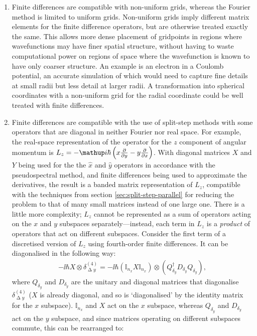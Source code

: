 \begin{enumerate}
    \item Finite differences are compatible with non-uniform grids, whereas the Fourier method is limited to uniform grids. Non-uniform grids imply different matrix elements \cite{fornberg_generation_1988} for the finite difference operators, but are otherwise treated exactly the same. This allows more dense placement of gridpoints in regions where wavefunctions may have finer spatial structure, without having to waste computational power on regions of space where the wavefunction is known to have only coarser structure. An example is an electron in a Coulomb potential, an accurate simulation of which would need to capture fine details at small radii but less detail at larger radii. A transformation into spherical coordinates with a non-uniform grid for the radial coordinate could be well treated with finite differences.
    \item Finite differences are compatible with the use of split-step methods with some operators that are diagonal in neither Fourier nor real space. For example, the real-space representation of the operator for the $z$ component of angular momentum is $L_z = -\ii\hbar\left(x\pdv{y} - y \pdv{x}\right)$. With diagonal matrices $X$ and $Y$ being used for the the $\hat x$ and $\hat y$ operators in accordance with the pseudospectral method, and finite differences being used to approximate the derivatives, the result is a banded matrix representation of $L_z$, compatible with the techniques from section \ref{sec:split-step-parallel} for reducing the problem to that of many small matrices instead of one large one. There is a little more complexity; $L_z$ cannot be represented as a sum of operators acting on the $x$ and $y$ subspaces separately---instead, each term in $L_z$ is a \emph{product} of operators that act on different subspaces. Consider the first term of a discretised version of $L_z$ using fourth-order finite differences. It can be diagonalised in the following way:
    \begin{align}
        -\ii\hbar X \otimes \delta^{(4)}_{\upDelta y}
        = -\ii\hbar\left(\mathbb{I}_{n_x} X \mathbb{I}_{n_x}\right)
        \otimes \left(Q_{\delta_y}^\dagger D_{\delta_y}Q_{\delta_y}\right),
    \end{align}
    where $Q_{\delta_y}$ and $D_{\delta_y}$ are the unitary and diagonal matrices that diagonalise $\delta^{(4)}_{\upDelta y}$ ($X$ is already diagonal, and so is `diagonalised' by the identity matrix for the $x$ subspace). $\mathbb{I}_{n_x}$ and $X$ act on the $x$ subspace, whereas $Q_{\delta_y}$ and $D_{\delta_y}$ act on the $y$ subspace, and since matrices operating on different subspaces commute, this can be rearranged to:

\end{enumerate}
